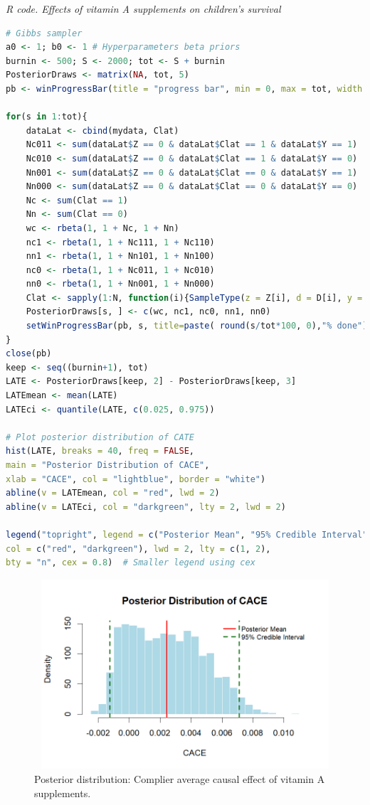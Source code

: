 \begin{tcolorbox}[enhanced,width=4.67in,center upper,
	fontupper=\large\bfseries,drop shadow southwest,sharp corners]
	\textit{R code. Effects of vitamin A supplements on children's survival}
	\begin{VF}
		\begin{lstlisting}[language=R]
# Gibbs sampler
a0 <- 1; b0 <- 1 # Hyperparameters beta priors
burnin <- 500; S <- 2000; tot <- S + burnin 
PosteriorDraws <- matrix(NA, tot, 5)
pb <- winProgressBar(title = "progress bar", min = 0, max = tot, width = 300)

for(s in 1:tot){
	dataLat <- cbind(mydata, Clat)
	Nc011 <- sum(dataLat$Z == 0 & dataLat$Clat == 1 & dataLat$Y == 1)
	Nc010 <- sum(dataLat$Z == 0 & dataLat$Clat == 1 & dataLat$Y == 0)
	Nn001 <- sum(dataLat$Z == 0 & dataLat$Clat == 0 & dataLat$Y == 1)
	Nn000 <- sum(dataLat$Z == 0 & dataLat$Clat == 0 & dataLat$Y == 0)
	Nc <- sum(Clat == 1)
	Nn <- sum(Clat == 0)
	wc <- rbeta(1, 1 + Nc, 1 + Nn)
	nc1 <- rbeta(1, 1 + Nc111, 1 + Nc110)
	nn1 <- rbeta(1, 1 + Nn101, 1 + Nn100)
	nc0 <- rbeta(1, 1 + Nc011, 1 + Nc010)
	nn0 <- rbeta(1, 1 + Nn001, 1 + Nn000)
	Clat <- sapply(1:N, function(i){SampleType(z = Z[i], d = D[i], y = Y[i], wc = wc, nc0 = nc0, nn0 = nn0)})
	PosteriorDraws[s, ] <- c(wc, nc1, nc0, nn1, nn0)
	setWinProgressBar(pb, s, title=paste( round(s/tot*100, 0),"% done"))
}
close(pb)
keep <- seq((burnin+1), tot)
LATE <- PosteriorDraws[keep, 2] - PosteriorDraws[keep, 3]
LATEmean <- mean(LATE)
LATEci <- quantile(LATE, c(0.025, 0.975))

# Plot posterior distribution of CATE
hist(LATE, breaks = 40, freq = FALSE,
main = "Posterior Distribution of CACE",
xlab = "CACE", col = "lightblue", border = "white")
abline(v = LATEmean, col = "red", lwd = 2)
abline(v = LATEci, col = "darkgreen", lty = 2, lwd = 2)

legend("topright", legend = c("Posterior Mean", "95% Credible Interval"),
col = c("red", "darkgreen"), lwd = 2, lty = c(1, 2),
bty = "n", cex = 0.8)  # Smaller legend using cex
\end{lstlisting}
	\end{VF}
\end{tcolorbox} 

\begin{figure}[h!]
	\includegraphics[width=340pt, height=200pt]{Chapters/chapter12/figures/CACE.png}
	\caption[List of figure caption goes here]{Posterior distribution: Complier average causal effect of vitamin A supplements.}\label{fig12_CACE}
\end{figure}


